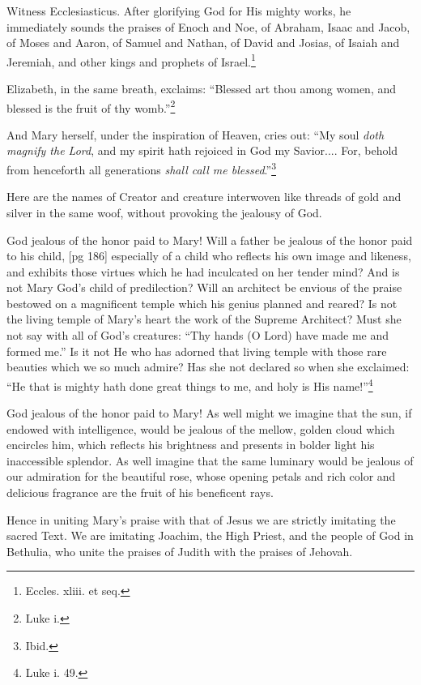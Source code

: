 Witness Ecclesiasticus. After glorifying God
for His mighty works, he immediately sounds the
praises of Enoch and Noe, of Abraham, Isaac and
Jacob, of Moses and Aaron, of Samuel and
Nathan, of David and Josias, of Isaiah and Jeremiah,
and other kings and prophets of Israel.\footnote{Eccles.
xliii. et seq.}

Elizabeth, in the same breath, exclaims:
“Blessed art thou among women, and blessed is
the fruit of thy womb.”\footnote{Luke i.}

And Mary herself, under the inspiration of
Heaven, cries out: “My soul \emph{doth magnify the
Lord}, and my spirit hath rejoiced in God my
Savior.... For, behold from henceforth all generations
\emph{shall call me blessed}.”\footnote{Ibid.}

Here are the names of Creator and creature interwoven
like threads of gold and silver in the
same woof, without provoking the jealousy of
God.

God jealous of the honor paid to Mary! Will a
father be jealous of the honor paid to his child,
[pg 186]
especially of a child who reflects his own image
and likeness, and exhibits those virtues which he
had inculcated on her tender mind? And is not
Mary God's child of predilection? Will an architect
be envious of the praise bestowed on a magnificent
temple which his genius planned and reared?
Is not the living temple of Mary's heart the work
of the Supreme Architect? Must she not say with
all of God's creatures: “Thy hands (O Lord) have
made me and formed me.” Is it not He who has
adorned that living temple with those rare beauties
which we so much admire? Has she not declared
so when she exclaimed: “He that is mighty hath
done great things to me, and holy is His
name!”\footnote{Luke i. 49.}

God jealous of the honor paid to Mary! As well
might we imagine that the sun, if endowed with
intelligence, would be jealous of the mellow, golden
cloud which encircles him, which reflects his
brightness and presents in bolder light his inaccessible
splendor. As well imagine that the same
luminary would be jealous of our admiration for
the beautiful rose, whose opening petals and rich
color and delicious fragrance are the fruit of his
beneficent rays.

Hence in uniting Mary's praise with that of
Jesus we are strictly imitating the sacred Text.
We are imitating Joachim, the High Priest, and
the people of God in Bethulia, who unite the praises
of Judith with the praises of Jehovah.

